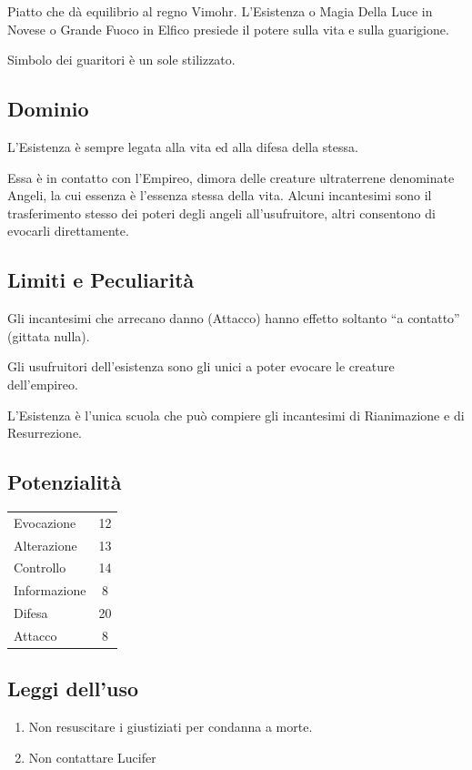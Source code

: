 
Piatto che d\`a equilibrio al regno Vimohr. L'Esistenza o Magia
Della Luce in Novese o Grande Fuoco in Elfico presiede il potere sulla
vita e sulla guarigione.

Simbolo dei guaritori \`e un sole stilizzato.

\subsection{Dominio}

L'Esistenza \`e sempre legata alla vita ed alla difesa della stessa.

Essa \`e in contatto con l'Empireo, dimora delle creature
ultraterrene denominate Angeli, la cui essenza \`e l'essenza stessa
della vita. Alcuni incantesimi sono il trasferimento stesso dei poteri
degli angeli all'usufruitore, altri consentono di evocarli
direttamente. 

\subsection{Limiti e Peculiarit\`a}

Gli incantesimi che arrecano danno (Attacco) hanno effetto soltanto
``a contatto'' (gittata nulla).

Gli usufruitori dell'esistenza sono gli unici a poter evocare le
creature dell'empireo.

L'Esistenza \`e l'unica scuola che pu\`o compiere gli incantesimi
di Rianimazione e di Resurrezione.

\subsection{Potenzialit\`a} 
\begin{tabular}{lc}
Evocazione& 12\\ 
Alterazione& 13\\
Controllo& 14\\
Informazione& 8\\
Difesa& 20\\
Attacco& 8\\
\end{tabular}

\subsection{Leggi dell'uso} 
\begin{enumerate}\itemsep -6pt
\item Non resuscitare i giustiziati per condanna a morte.
\item Non contattare Lucifer
\end{enumerate}


